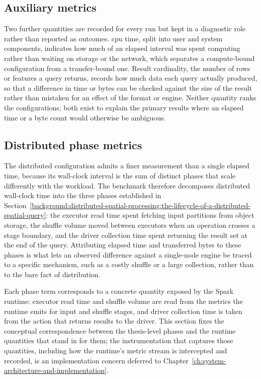 \subsection{Auxiliary metrics}
\label{research-design-and-methodology:metrics-and-cost-model:auxiliary-metrics}

Two further quantities are recorded for every run but kept in a diagnostic role rather than reported as outcomes. \acrshort{cpu} time, split into user and system components, indicates how much of an elapsed interval was spent computing rather than waiting on storage or the network, which separates a compute-bound configuration from a transfer-bound one. Result cardinality, the number of rows or features a query returns, records how much data each query actually produced, so that a difference in time or bytes can be checked against the size of the result rather than mistaken for an effect of the format or engine. Neither quantity ranks the configurations; both exist to explain the primary results where an elapsed time or a byte count would otherwise be ambiguous.

\subsection{Distributed phase metrics}
\label{research-design-and-methodology:metrics-and-cost-model:distributed-phase-metrics}

The distributed configuration admits a finer measurement than a single elapsed time, because its wall-clock interval is the sum of distinct phases that scale differently with the workload. The benchmark therefore decomposes distributed wall-clock time into the three phases established in Section~\ref{background:distributed-spatial-processing:the-lifecycle-of-a-distributed-spatial-query}: the executor read time spent fetching input partitions from object storage, the shuffle volume moved between executors when an operation crosses a stage boundary, and the driver collection time spent returning the result set at the end of the query. Attributing elapsed time and transferred bytes to these phases is what lets an observed difference against a single-node engine be traced to a specific mechanism, such as a costly shuffle or a large collection, rather than to the bare fact of distribution.

Each phase term corresponds to a concrete quantity exposed by the Spark runtime: executor read time and shuffle volume are read from the metrics the runtime emits for input and shuffle stages, and driver collection time is taken from the action that returns results to the driver. This section fixes the conceptual correspondence between the thesis-level phases and the runtime quantities that stand in for them; the instrumentation that captures those quantities, including how the runtime's metric stream is intercepted and recorded, is an implementation concern deferred to Chapter~\ref{ch:system-architecture-and-implementation}.

